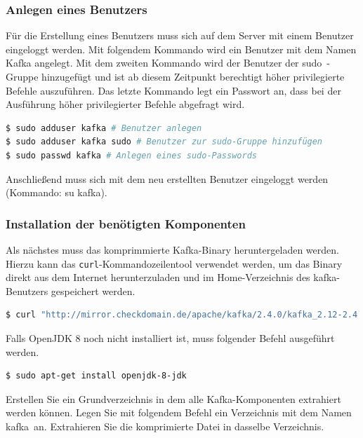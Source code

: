 \documentclass[a4paper,titlepage,halfparskip,12pt]{scrreprt}
\begin{document}
\begin{onehalfspacing}
\subsubsection*{Anlegen eines Benutzers}

Für die Erstellung eines Benutzers muss sich auf dem Server mit einem Benutzer eingeloggt werden. Mit folgendem Kommando wird ein Benutzer mit dem Namen Kafka angelegt. Mit dem zweiten Kommando wird der Benutzer der \glqq sudo\grqq\ -Gruppe hinzugefügt und ist ab diesem Zeitpunkt berechtigt höher privilegierte Befehle auszuführen. Das letzte Kommando legt ein Passwort an, dass bei der Ausführung höher privilegierter Befehle abgefragt wird.

\smallskip

\begin{lstlisting}[language=Bash]
$ sudo adduser kafka # Benutzer anlegen
$ sudo adduser kafka sudo # Benutzer zur sudo-Gruppe hinzufügen
$ sudo passwd kafka # Anlegen eines sudo-Passwords
\end{lstlisting}

Anschließend muss sich mit dem neu erstellten Benutzer eingeloggt werden (Kommando: su kafka).

\subsubsection*{Installation der benötigten Komponenten}


Als nächstes muss das komprimmierte Kafka-Binary heruntergeladen werden. Hierzu kann das \texttt{curl}-Kommandozeilentool verwendet werden, um das Binary direkt aus dem Internet herunterzuladen und im Home-Verzeichnis des kafka-Benutzers gespeichert werden.

\smallskip

\begin{lstlisting}[language=Bash]
$ curl "http://mirror.checkdomain.de/apache/kafka/2.4.0/kafka_2.12-2.4.0.tgz" -o ~/kafka_2.12-2.4.0.tgz
\end{lstlisting}

Falls OpenJDK 8 noch nicht installiert ist, muss folgender Befehl ausgeführt werden.

\smallskip

\begin{lstlisting}[language=Bash]
$ sudo apt-get install openjdk-8-jdk
\end{lstlisting}

Erstellen Sie ein Grundverzeichnis in dem alle Kafka-Komponenten extrahiert werden können. Legen Sie mit folgendem Befehl ein Verzeichnis mit dem Namen \glqq kafka\grqq\ an. Extrahieren Sie die komprimierte Datei in dasselbe Verzeichnis.


\end{onehalfspacing}
\end{document}

